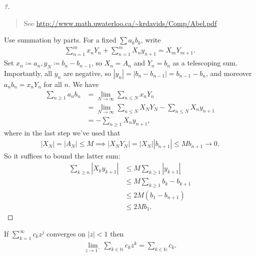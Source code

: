\begin{proof}[?]

\begin{quote}
See \url{http://www.math.uwaterloo.ca/~krdavids/Comp/Abel.pdf}
\end{quote}

Use summation by parts. For a fixed \(\sum a_k b_k\), write
\begin{align*}
\sum_{n=1}^m x_n Y_n + \sum_{n=1}^m X_n y_{n+1} = X_m Y_{m+1}
.\end{align*}
Set \(x_n \coloneqq a_n, y_N \coloneqq b_n - b_{n-1}\), so \(X_n = A_n\)
and \(Y_n = b_n\) as a telescoping sum. Importantly, all \(y_n\) are
negative, so
\({\left\lvert {y_n} \right\rvert} = {\left\lvert {b_n - b_{n-1}} \right\rvert} = b_{n-1} - b_n\),
and moreover \(a_n b_n = x_n Y_n\) for all \(n\). We have
\begin{align*}
\sum_{n\geq 1} a_n b_n 
&= \lim_{N\to\infty} \sum_{n\leq N} x_n Y_n \\
&= \lim_{N\to\infty} \sum_{n\leq N} X_N Y_N - \sum_{n\leq N} X_n y_{n+1} \\
&= - \sum_{n\geq 1} X_n y_{n+1},
\end{align*}
where in the last step we've used that
\begin{align*}
{\left\lvert {X_N} \right\rvert} = {\left\lvert {A_N} \right\rvert}\leq M \implies {\left\lvert {X_N Y_{N} } \right\rvert} = {\left\lvert {X_N} \right\rvert} {\left\lvert {b_{n+1}} \right\rvert} \leq M b_{n+1} \to 0
.\end{align*}
So it suffices to bound the latter sum:
\begin{align*}
\sum_{k\geq n}{\left\lvert { X_k y_{k+1} } \right\rvert} 
&\leq M \sum_{k\geq 1} {\left\lvert {y_{k+1}} \right\rvert}\\
&\leq M \sum_{k\geq 1} b_{k} - b_{k+1} \\
&\leq 2M(b_1 - b_{n+1})\\
&\leq 2M b_1
.\end{align*}

\end{proof}

\begin{theorem}

If \(\sum_{k=1}^\infty c_k z^j\) converges on
\({\left\lvert {z} \right\rvert} < 1\) then
\begin{align*}
\lim_{z\to 1^-} \sum_{k\in {\mathbb{N}}} c_k z^k = \sum_{k\in {\mathbb{N}}} c_k
.\end{align*}

\end{theorem}

